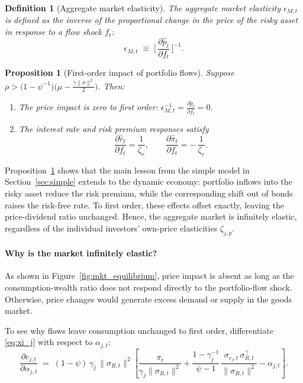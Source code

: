 \documentclass[12pt,english]{article}
\newtheorem{defn}{Definition}
\newtheorem{prop}{Proposition}
\begin{document}
\begin{defn}[Aggregate market elasticity]
The aggregate market elasticity $\epsilon_{M,t}$ is defined as the inverse of the proportional change in the price of the risky asset in response to a flow shock $f_t$:
\[
    \epsilon_{M,t} \;\equiv\; \Big[\,\frac{\partial \hat{p}_t}{\partial f_t}\,\Big]^{-1}.
\]
\end{defn}

\begin{prop}[First-order impact of portfolio flows]\label{prop:first_order}
Suppose $\rho>\big(1-\psi^{-1}\big)\big(\mu - \tfrac{\gamma\|\sigma\|^2}{2}\big)$. Then:
\begin{enumerate}[label=(\roman*)]
    \item The price impact is zero to first order:
    \(
        \epsilon_{M,t}^{-1}=\frac{\partial \hat{p}_t}{\partial f_t}=0 .
    \)
    \item The interest rate and risk premium responses satisfy
    \[
        \frac{\partial \hat{r}_t}{\partial f_t}=\frac{1}{\zeta_r},
        \qquad
        \frac{\partial \hat{\pi}_t}{\partial f_t}=-\,\frac{1}{\zeta_r}.
    \]
\end{enumerate}
\end{prop}

Proposition~\ref{prop:first_order} shows that the main lesson from the simple model in Section~\ref{sec:simple} extends to the dynamic economy: portfolio inflows into the risky asset reduce the risk premium, while the corresponding shift out of bonds raises the risk-free rate. To first order, these effects offset exactly, leaving the price-dividend ratio unchanged. Hence, the aggregate market is infinitely elastic, regardless of the individual investors’ own-price elasticities $\zeta_{j,p}$.


\paragraph{Why is the market infinitely elastic?}  
As shown in Figure~\ref{fig:mkt_equilibrium}, price impact is absent as long as the consumption-wealth ratio does not respond directly to the portfolio-flow shock. Otherwise, price changes would generate excess demand or supply in the goods market.

To see why flows leave consumption unchanged to first order, differentiate \eqref{eq:xi_j} with respect to $\alpha_{j,t}$:
\begin{equation}
    \frac{\partial c_{j,t}}{\partial \alpha_{j,t}}
    \;=\;
    (1-\psi)\,\gamma_j\,\|\sigma_{R,t}\|^2
    \left[
        \frac{\pi_t}{\gamma_j \|\sigma_{R,t}\|^2}
        + \frac{1-\gamma_j^{-1}}{\psi-1}\,
          \frac{\sigma_{c_j,t}\,\sigma_{R,t}^\top}{\|\sigma_{R,t}\|^2}
        - \alpha_{j,t}
    \right]\!.
\end{equation}
\end{document}
